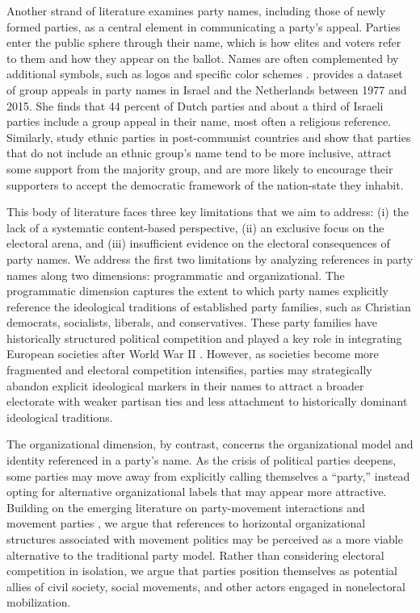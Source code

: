 \documentclass[12pt]{article}
\begin{document}
Another strand of literature examines party names, including those of newly formed parties, as a central element in communicating a party's appeal. Parties enter the public sphere through their name, which is how elites and voters refer to them and how they appear on the ballot. Names are often complemented by additional symbols, such as logos and specific color schemes \citep{Casiraghi_Curini_Cusumano_2022, Casiraghi_Cusumano_Chryssogelos_2023, Avina_Spoon_2024}. \citet{Dolinsky_2022} provides a dataset of group appeals in party names in Israel and the Netherlands between 1977 and 2015. She finds that 44 percent of Dutch parties and about a third of Israeli parties include a group appeal in their name, most often a religious reference. Similarly, \citet{Ishiyama_Breuning_2011} study ethnic parties in post-communist countries and show that parties that do not include an ethnic group's name tend to be more inclusive, attract some support from the majority group, and are more likely to encourage their supporters to accept the democratic framework of the nation-state they inhabit.

This body of literature faces three key limitations that we aim to address: (i) the lack of a systematic content-based perspective, (ii) an exclusive focus on the electoral arena, and (iii) insufficient evidence on the electoral consequences of party names. We address the first two limitations by analyzing references in party names along two dimensions: programmatic and organizational. The programmatic dimension captures the extent to which party names explicitly reference the ideological traditions of established party families, such as Christian democrats, socialists, liberals, and conservatives. These party families have historically structured political competition and played a key role in integrating European societies after World War II \citep[e.g.,][]{Kirchheimer_1966}. However, as societies become more fragmented and electoral competition intensifies, parties may strategically abandon explicit ideological markers in their names to attract a broader electorate with weaker partisan ties and less attachment to historically dominant ideological traditions.

The organizational dimension, by contrast, concerns the organizational model and identity referenced in a party's name. As the crisis of political parties deepens, some parties may move away from explicitly calling themselves a ``party,'' instead opting for alternative organizational labels that may appear more attractive. Building on the emerging literature on party-movement interactions and movement parties \citep[e.g.,][]{della_Porta_et_al_2017, Pirro_Gattinara_2018, Tarrow_2021, Castelli_Gattinara_Pirro_2024}, we argue that references to horizontal organizational structures associated with movement politics may be perceived as a more viable alternative to the traditional party model. Rather than considering electoral competition in isolation, we argue that parties position themselves as potential allies of civil society, social movements, and other actors engaged in nonelectoral mobilization.
\end{document}
